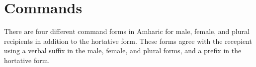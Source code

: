 \documentclass[12pt]{article}
\newcommand{\orth}[1]{\textit{\StrSubstitute{#1}{I}{\'{i}}[\x]\StrSubstitute{\x}{E}{\'{e}}[\x]\StrSubstitute{\x}{N}{\~{n}}[\x]\x}}
\begin{document}
\newpage
\section{Commands}
\setcounter{exx}{0}
There are four different command forms in Amharic for male, female, and plural recipients in addition to the hortative form. These forms agree with the recepient using a verbal suffix in the male, female, and plural forms, and a prefix in the hortative form.

\end{document}
